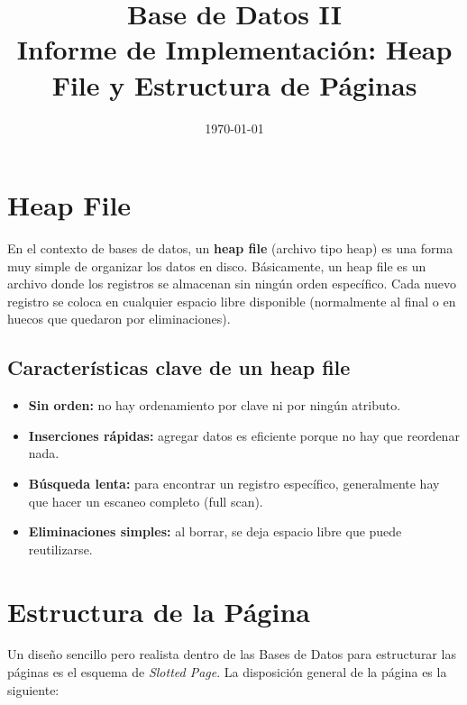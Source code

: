 \documentclass[12pt,a4paper]{article}
\title{\textbf{Base de Datos II}\\ Informe de Implementación: Heap File y Estructura de Páginas}
\author{}
\date{\today}
\begin{document}
\maketitle

\section{Heap File}
En el contexto de bases de datos, un \textbf{heap file} (archivo tipo heap) es una forma muy simple de organizar los datos en disco. Básicamente, un heap file es un archivo donde los registros se almacenan sin ningún orden específico. Cada nuevo registro se coloca en cualquier espacio libre disponible (normalmente al final o en huecos que quedaron por eliminaciones).

\subsection*{Características clave de un heap file}
\begin{itemize}
    \item \textbf{Sin orden:} no hay ordenamiento por clave ni por ningún atributo.
    \item \textbf{Inserciones rápidas:} agregar datos es eficiente porque no hay que reordenar nada.
    \item \textbf{Búsqueda lenta:} para encontrar un registro específico, generalmente hay que hacer un escaneo completo (full scan).
    \item \textbf{Eliminaciones simples:} al borrar, se deja espacio libre que puede reutilizarse.
\end{itemize}

\section{Estructura de la Página}
Un diseño sencillo pero realista dentro de las Bases de Datos para estructurar las páginas es el esquema de \textit{Slotted Page}. La disposición general de la página es la siguiente:

\vspace{0.5cm}
\begin{center}
\end{center}
\vspace{0.5cm}
\end{document}
